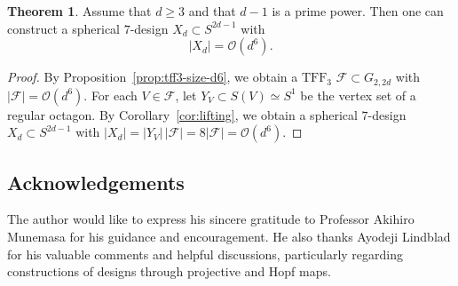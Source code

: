 \documentclass{amsart}
\theoremstyle{definition}
\newtheorem{theorem}{Theorem}[section]
\theoremstyle{remark}
\numberwithin{equation}{section}
\newcommand{\TFF}{\mathrm{TFF}}
\begin{document}
\begin{theorem}\label{thm:sph7-size-d6}
Assume that $d\ge 3$ and that $d-1$ is a prime power.
Then one can construct a spherical $7$-design $X_d\subset S^{2d-1}$ with
\[
|X_d|=\mathcal{O}\!\left(d^6\right).
\]
\end{theorem}

\begin{proof}
By Proposition~\ref{prop:tff3-size-d6}, we obtain a $\TFF_3$
$\mathcal{F}\subset G_{2,2d}$ with $|\mathcal{F}|=\mathcal{O}(d^6)$.
For each $V\in\mathcal{F}$, let $Y_V\subset S(V)\simeq S^1$ be the vertex set of a regular octagon.
By Corollary~\ref{cor:lifting}, we obtain a spherical $7$-design $X_d\subset S^{2d-1}$ with \(
|X_d|=|Y_V|\,|\mathcal{F}|=8|\mathcal{F}|=\mathcal{O}(d^6).
\)
\end{proof}


\subsection*{Acknowledgements}

The author would like to express his sincere gratitude to Professor Akihiro Munemasa for his guidance and encouragement.
He also thanks Ayodeji Lindblad for his valuable comments and helpful discussions, particularly regarding constructions of designs through projective and Hopf maps.

\end{document}
